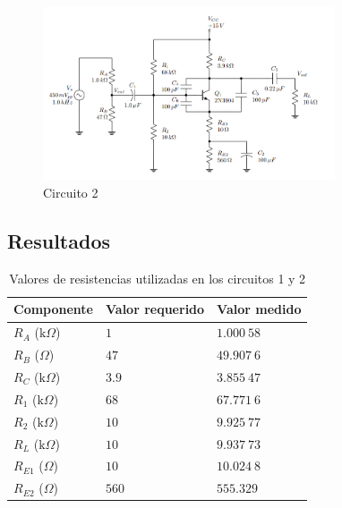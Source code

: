 \documentclass[journal]{IEEEtran}
\begin{document}
\begin{figure}[H]
        \centering
        \includegraphics[width=3.4in]{Circuito2.png}
        \caption{Circuito 2}
        \label{fig:SignalExperimental_044}
\end{figure}

\vspace{1cm}


\subsection{Resultados}


\begin{table}[H]
        \centering
        \renewcommand{\arraystretch}{1.5}
        \caption{Valores de resistencias utilizadas en los circuitos 1 y 2}
        \begin{tabular}{ >{\centering\arraybackslash}m{2.5cm} >{\centering\arraybackslash}m{2.5cm} >{\centering\arraybackslash}m{2.5cm} }
                \hline
            \centering
            Componente & Valor requerido & Valor medido\\ 
            \hline
            \centering
            $R_A$ ($\mathrm{k}\Omega$) & $1$  & $1.000~58$  \\ 
            $R_B$ ($\Omega$) & $47$  & $49.907~6$  \\
            $R_C$ ($\mathrm{k}\Omega$) & $3.9$  & $3.855~47$  \\
            $R_1$ ($\mathrm{k}\Omega$) & $68$  & $67.771~6$ \\
            $R_2$ ($\mathrm{k}\Omega$) & $10$  & $9.925~77$ \\
            $R_L$ ($\mathrm{k}\Omega$) & $10$  & $9.937~73$ \\
            $R_{E1}$ ($\Omega$) & $10$  & $10.024~8$ \\
            $R_{E2}$ ($\Omega$) & $560$  & $555.329$ \\
            \hline
        \end{tabular}
        \label{tabla1}
    \end{table}
    
\end{document}
